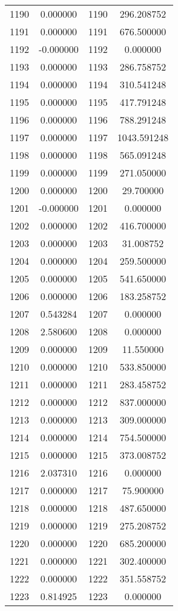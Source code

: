 \documentclass[12pt]{article}
\begin{document}
\begin{longtable}{@{}cccc@{}}
1190 & 0.000000 & 1190 & 296.208752 \\
1191 & 0.000000 & 1191 & 676.500000 \\
1192 & -0.000000 & 1192 & 0.000000 \\
1193 & 0.000000 & 1193 & 286.758752 \\
1194 & 0.000000 & 1194 & 310.541248 \\
1195 & 0.000000 & 1195 & 417.791248 \\
1196 & 0.000000 & 1196 & 788.291248 \\
1197 & 0.000000 & 1197 & 1043.591248 \\
1198 & 0.000000 & 1198 & 565.091248 \\
1199 & 0.000000 & 1199 & 271.050000 \\
1200 & 0.000000 & 1200 & 29.700000 \\
1201 & -0.000000 & 1201 & 0.000000 \\
1202 & 0.000000 & 1202 & 416.700000 \\
1203 & 0.000000 & 1203 & 31.008752 \\
1204 & 0.000000 & 1204 & 259.500000 \\
1205 & 0.000000 & 1205 & 541.650000 \\
1206 & 0.000000 & 1206 & 183.258752 \\
1207 & 0.543284 & 1207 & 0.000000 \\
1208 & 2.580600 & 1208 & 0.000000 \\
1209 & 0.000000 & 1209 & 11.550000 \\
1210 & 0.000000 & 1210 & 533.850000 \\
1211 & 0.000000 & 1211 & 283.458752 \\
1212 & 0.000000 & 1212 & 837.000000 \\
1213 & 0.000000 & 1213 & 309.000000 \\
1214 & 0.000000 & 1214 & 754.500000 \\
1215 & 0.000000 & 1215 & 373.008752 \\
1216 & 2.037310 & 1216 & 0.000000 \\
1217 & 0.000000 & 1217 & 75.900000 \\
1218 & 0.000000 & 1218 & 487.650000 \\
1219 & 0.000000 & 1219 & 275.208752 \\
1220 & 0.000000 & 1220 & 685.200000 \\
1221 & 0.000000 & 1221 & 302.400000 \\
1222 & 0.000000 & 1222 & 351.558752 \\
1223 & 0.814925 & 1223 & 0.000000 \\

\end{longtable}
\end{document}
